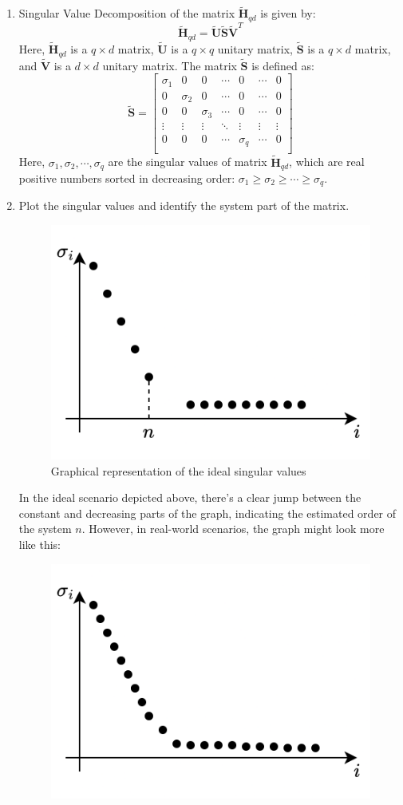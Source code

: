 \begin{enumerate}
    \item Singular Value Decomposition of the matrix $\tilde{\mathbf{H}}_{qd}$ is given by:
        \[\tilde{\mathbf{H}}_{qd}=\tilde{\mathbf{U}}\tilde{\mathbf{S}}\tilde{\mathbf{V}}^T\]
        Here, $\tilde{\mathbf{H}}_{qd}$ is a $q \times d$ matrix, $\tilde{\mathbf{U}}$ is a $q \times q$ unitary matrix, $\tilde{\mathbf{S}}$ is a $q \times d$ matrix, and $\tilde{\mathbf{V}}$ is a $d \times d$ unitary matrix. 
        The matrix $\tilde{\mathbf{S}}$ is defined as: 
        \[\tilde{\mathbf{S}}=\begin{bmatrix}
            \sigma_1 & 0 & 0 & \cdots & 0 & \cdots & 0\\ 
            0 & \sigma_2 & 0 & \cdots & 0 & \cdots & 0\\ 
            0 & 0 & \sigma_3 & \cdots & 0 & \cdots & 0\\ 
            \vdots & \vdots  & \vdots  & \ddots  & \vdots  & \vdots & \vdots\\ 
            0 & 0 & 0 & \cdots & \sigma_q & \cdots & 0\\ 
        \end{bmatrix}\]
        Here, $\sigma_1,\sigma_2,\cdots,\sigma_q$ are the singular values of matrix $\tilde{\mathbf{H}}_{qd}$, which are real positive numbers sorted in decreasing order: $\sigma_1\geq\sigma_2\geq\cdots\geq\sigma_q$. 
    \item Plot the singular values and identify the system part of the matrix. 
        \begin{figure}[H]
            \centering
            \includegraphics[width=0.4\linewidth]{images/qd1.png}
            \caption{Graphical representation of the ideal singular values}
        \end{figure}
        In the ideal scenario depicted above, there's a clear jump between the constant and decreasing parts of the graph, indicating the estimated order of the system $n$.
        However, in real-world scenarios, the graph might look more like this:
        \begin{figure}[H]
            \centering
            \includegraphics[width=0.4\linewidth]{images/qd2.png}

\end{figure}
\end{enumerate}
